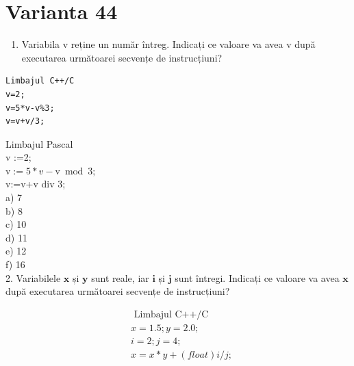 \documentclass[10pt]{article}
\begin{document}
\section*{Varianta 44}
\begin{enumerate}
  \item Variabila v reține un număr întreg. Indicați ce valoare va avea v după executarea următoarei secvențe de instrucțiuni?
\end{enumerate}

\begin{verbatim}
Limbajul C++/C
v=2;
v=5*v-v%3;
v=v+v/3;
\end{verbatim}

Limbajul Pascal\\
v :=2;\\
$\mathrm{v}:=5 * v-\mathrm{v} \bmod 3 ;$\\
v:=v+v div 3;\\
a) 7\\
b) 8\\
c) 10\\
d) 11\\
e) 12\\
f) 16\\
2. Variabilele $\mathbf{x}$ și $\mathbf{y}$ sunt reale, iar $\mathbf{i}$ și $\mathbf{j}$ sunt întregi. Indicați ce valoare va avea $\mathbf{x}$ după executarea următoarei secvențe de instrucțiuni?

$$
\begin{aligned}
& \text { Limbajul C++/C } \\
& x=1.5 ; y=2.0 ; \\
& i=2 ; j=4 ; \\
& x=x * y+(f l o a t) i / j ;
\end{aligned}
$$
\end{document}
